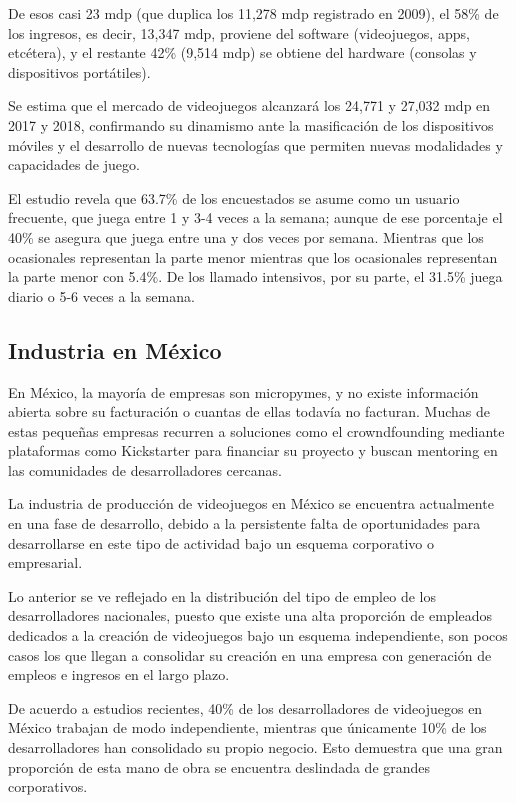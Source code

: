 De esos casi 23 mdp (que duplica los 11,278 mdp registrado en 2009), el 58\% de los ingresos, es decir, 13,347 mdp, proviene del software (videojuegos, apps, etcétera), y el restante 42\% (9,514 mdp) se obtiene del hardware (consolas y dispositivos portátiles).

Se estima que el mercado de videojuegos alcanzará los 24,771 y 27,032 mdp en 2017 y 2018, confirmando su dinamismo ante la masificación de los dispositivos móviles y el desarrollo de nuevas tecnologías que permiten nuevas modalidades y capacidades de juego.

El estudio revela que 63.7\% de los encuestados se asume como un usuario frecuente, que juega entre 1 y 3-4 veces a la semana; aunque de ese porcentaje el 40\% se asegura que juega entre una y dos veces por semana. Mientras que los ocasionales representan la parte menor mientras que los ocasionales representan la parte menor con 5.4\%. De los llamado intensivos, por su parte, el 31.5\% juega diario o 5-6 veces a la semana.

\subsection{Industria en México}
En México, la mayoría de empresas son micropymes, y no existe información abierta sobre su facturación o cuantas de ellas todavía no facturan. Muchas de estas pequeñas empresas recurren a soluciones como el crowndfounding mediante plataformas como Kickstarter para financiar su proyecto y buscan mentoring en las comunidades de desarrolladores cercanas. 

La industria de producción de videojuegos en México se encuentra actualmente en una fase de desarrollo, debido a la persistente falta de oportunidades para desarrollarse en este tipo de actividad bajo un esquema corporativo o empresarial.

Lo anterior se ve reflejado en la distribución del tipo de empleo de los desarrolladores nacionales, puesto que existe una alta proporción de empleados dedicados a la creación de videojuegos bajo un esquema independiente, son pocos casos los que llegan a consolidar su creación en una empresa con generación de empleos e ingresos en el largo plazo.

De acuerdo a estudios recientes, 40\% de los desarrolladores de videojuegos en México trabajan de modo independiente, mientras que únicamente 10\% de los desarrolladores han consolidado su propio negocio. Esto demuestra que una gran proporción de esta mano de obra se encuentra deslindada de grandes corporativos.

